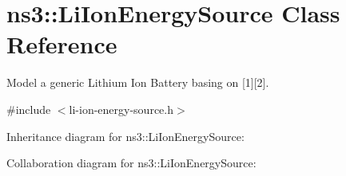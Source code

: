 \hypertarget{classns3_1_1LiIonEnergySource}{}\section{ns3\+:\+:Li\+Ion\+Energy\+Source Class Reference}
\label{classns3_1_1LiIonEnergySource}


Model a generic Lithium Ion Battery basing on \mbox{[}1\mbox{]}\mbox{[}2\mbox{]}.  




{\ttfamily \#include $<$li-\/ion-\/energy-\/source.\+h$>$}



Inheritance diagram for ns3\+:\+:Li\+Ion\+Energy\+Source\+:


Collaboration diagram for ns3\+:\+:Li\+Ion\+Energy\+Source\+:
